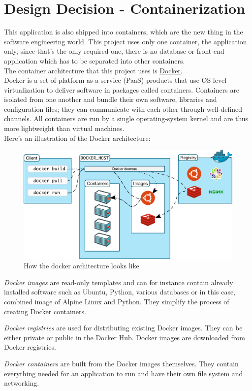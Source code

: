 \section{Design Decision - Containerization}
This application is also shipped into containers, which are the new thing in the software engineering world. This project uses only one container, the application only, since that's the only required one, there is no database or front-end application which has to be separated into other containers.\\
The container architecture that this project uses is \href{https://www.docker.com/}{Docker}.\\
Docker is a set of platform as a service (PaaS) products that use OS-level virtualization to deliver software in packages called containers. Containers are isolated from one another and bundle their own software, libraries and configuration files; they can communicate with each other through well-defined channels. All containers are run by a single operating-system kernel and are thus more lightweight than virtual machines. \cite{WhatIsDocker}\\
\newline
Here's an illustration of the Docker architecture:

\begin{figure}[H]
	\includegraphics[width=\linewidth]{./Images/ArchitectureDesign/docker_architecture.png}
	\caption{How the docker architecture looks like \cite{DockerOverview}}
\end{figure}
\textit{Docker images} are read-only templates and can for instance contain already installed software such as Ubuntu, Python, various databases or in this case, combined image of Alpine Linux and Python. They simplify the process of creating Docker containers.

\textit{Docker registries} are used for distributing existing Docker images. They can be either private or public in the \href{https://hub.docker.com/}{Docker Hub}. Docker images are downloaded from Docker registries.

\textit{Docker containers} are built from the Docker images themselves. They contain everything needed for an application to run and have their own file system and networking.


